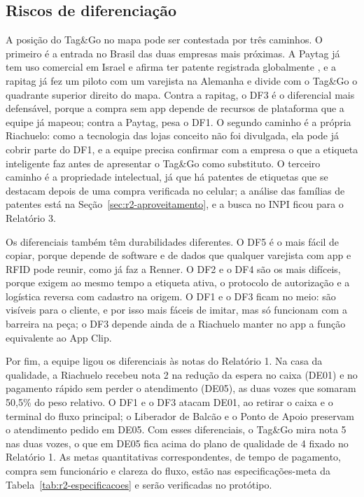 \subsection{Riscos de diferenciação}
\label{sub:r2-dif-riscos}

A posição do Tag\&Go no mapa pode ser contestada por três caminhos. O primeiro é a entrada no Brasil das duas empresas mais próximas. A Paytag já tem uso comercial em Israel e afirma ter patente registrada globalmente \cite{calcalist2026paytag}, e a rapitag já fez um piloto com um varejista na Alemanha e divide com o Tag\&Go o quadrante superior direito do mapa. Contra a rapitag, o DF3 é o diferencial mais defensável, porque a compra sem app depende de recursos de plataforma que a equipe já mapeou; contra a Paytag, pesa o DF1. O segundo caminho é a própria Riachuelo: como a tecnologia das lojas conceito não foi divulgada, ela pode já cobrir parte do DF1, e a equipe precisa confirmar com a empresa o que a etiqueta inteligente faz antes de apresentar o Tag\&Go como substituto. O terceiro caminho é a propriedade intelectual, já que há patentes de etiquetas que se destacam depois de uma compra verificada no celular; a análise das famílias de patentes está na Seção~\ref{sec:r2-aproveitamento}, e a busca no INPI ficou para o Relatório 3.

Os diferenciais também têm durabilidades diferentes. O DF5 é o mais fácil de copiar, porque depende de software e de dados que qualquer varejista com app e RFID pode reunir, como já faz a Renner. O DF2 e o DF4 são os mais difíceis, porque exigem ao mesmo tempo a etiqueta ativa, o protocolo de autorização e a logística reversa com cadastro na origem. O DF1 e o DF3 ficam no meio: são visíveis para o cliente, e por isso mais fáceis de imitar, mas só funcionam com a barreira na peça; o DF3 depende ainda de a Riachuelo manter no app a função equivalente ao App Clip.

Por fim, a equipe ligou os diferenciais às notas do Relatório 1. Na casa da qualidade, a Riachuelo recebeu nota 2 na redução da espera no caixa (DE01) e no pagamento rápido sem perder o atendimento (DE05), as duas vozes que somaram 50,5\% do peso relativo. O DF1 e o DF3 atacam DE01, ao retirar o caixa e o terminal do fluxo principal; o Liberador de Balcão e o Ponto de Apoio preservam o atendimento pedido em DE05. Com esses diferenciais, o Tag\&Go mira nota 5 nas duas vozes, o que em DE05 fica acima do plano de qualidade de 4 fixado no Relatório 1. As metas quantitativas correspondentes, de tempo de pagamento, compra sem funcionário e clareza do fluxo, estão nas especificações-meta da Tabela~\ref{tab:r2-especificacoes} e serão verificadas no protótipo.
